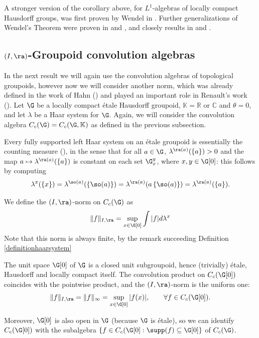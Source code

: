 \begin{remark}
A stronger version of the corollary above, for $L^1$-algebras of locally compact Hausdorff groups, was first proven by Wendel in \cite{MR0049910}. Further generalizations of Wendel's Theorem were proven in \cite{MR0177058} and \cite{MR0193531}, and closely results in \cite{MR0160846} and \cite{MR0361622}.
\end{remark}

\subsection{$(I,\ra)$-Groupoid convolution algebras}

In the next result we will again use the convolution algebras of topological groupoids, however now we will consider another norm, which was already defined in the work of Hahn (\cite{MR496797}) and played an important role in Renault's work (\cite{MR584266}). Let $\G$ be a locally compact étale Hausdorff groupoid, $\mathbb{K}=\mathbb{R}$ or $\mathbb{C}$ and $\theta=0$, and let $\lambda$ be a Haar system for $\G$. Again, we will consider the convolution algebra $C_c(\G)=C_c(\G,\mathbb{K})$ as defined in the previous subsection.

Every fully supported left Haar system on an étale groupoid is essentially the counting measure (\cite[2.7]{MR584266}), in the sense that for all $a\in\G$, $\lambda^{\ra(a)}(\left\{a\right\})>0$ and the map $a\mapsto \lambda^{\ra(a)}(\left\{a\right\})$ is constant on each set $\G_x^y$, where $x,y\in\G[0]$: this follows by computing
\[\lambda^x(\left\{x\right\})=\lambda^{\so(a)}(\left\{\so(a)\right\})=\lambda^{\ra(a)}(a\left\{\so(a)\right\})=\lambda^{\ra(a)}(\left\{a\right\}).\]

We define the $(I,\ra)$-norm on $C_c(\G)$ as
\[\Vert f\Vert_{I,\ra}=\sup_{x\in\G[0]}\int |f|d\lambda^x\]
Note that this norm is always finite, by the remark succeeding Definition \ref{definitionhaarsystem}

The unit space $\G[0]$ of $\G$ is a closed unit subgroupoid, hence (trivially) étale, Hausdorff and locally compact itself. The convolution product on $C_c(\G[0])$ coincides with the pointwise product, and the $(I,\ra)$-norm is the uniform one:
\[\Vert f\Vert_{I,\ra}=\Vert f\Vert_\infty=\sup_{x\in\G[0]}|f(x)|,\qquad\forall f\in C_c(\G[0]).\]

Moreover, $\G[0]$ is also open in $\G$ (because $\G$ is étale), so we can identify $C_c(\G[0])$ with the subalgebra $\left\{f\in C_c(\G[0]:\supp(f)\subseteq\G[0]\right\}$ of $C_c(\G)$.

